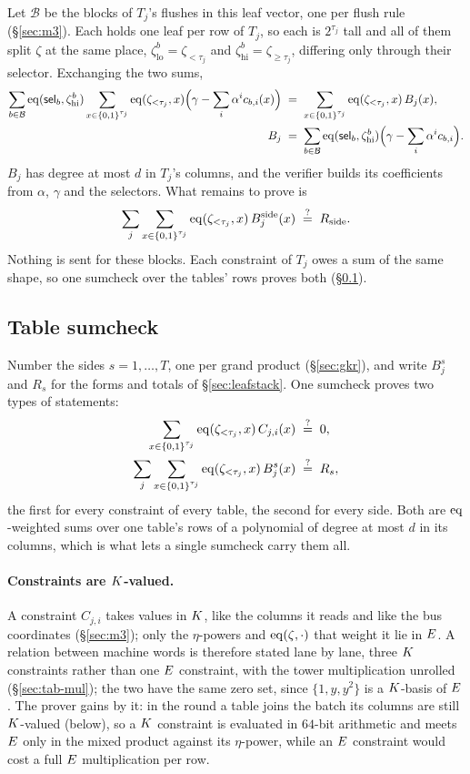 Let $\mathcal B$ be the blocks of $T_j$'s flushes in this leaf vector, one per flush rule (\S\ref{sec:m3}). Each holds one leaf per row of $T_j$, so each is $2^{\tau_j}$ tall and all of them split $\zeta$ at the same place, $\zeta^{b}_{\mathrm{lo}}=\zeta_{<\tau_j}$ and $\zeta^{b}_{\mathrm{hi}}=\zeta_{\ge\tau_j}$, differing only through their selector. Exchanging the two sums,
\begin{align*}
  \sum_{b\in\mathcal B}\operatorname{eq}(\mathsf{sel}_b,\zeta^{b}_{\mathrm{hi}})\sum_{x\in\{0,1\}^{\tau_j}}\operatorname{eq}(\zeta_{<\tau_j},x)\Bigl(\gamma-\sum_{i}\alpha^{i}c_{b,i}(x)\Bigr)
  &\;=\;\sum_{x\in\{0,1\}^{\tau_j}}\operatorname{eq}(\zeta_{<\tau_j},x)\,B_j(x),\\
  B_j&\;=\;\sum_{b\in\mathcal B}\operatorname{eq}(\mathsf{sel}_b,\zeta^{b}_{\mathrm{hi}})\Bigl(\gamma-\sum_i\alpha^{i}c_{b,i}\Bigr).
\end{align*}
$B_j$ has degree at most $d$ in $T_j$'s columns, and the verifier builds its coefficients from $\alpha$, $\gamma$ and the selectors. What remains to prove is
\[
  \sum_j\sum_{x\in\{0,1\}^{\tau_j}}\operatorname{eq}(\zeta_{<\tau_j},x)\,B^{\mathrm{side}}_j(x)\;\stackrel{?}{=}\;R_{\mathrm{side}} .
\]
Nothing is sent for these blocks. Each constraint of $T_j$ owes a sum of the same shape, so one sumcheck over the tables' rows proves both (\S\ref{sec:air}).

\subsection{Table sumcheck}\label{sec:air}

Number the sides $s=1,\dots,T$, one per grand product (\S\ref{sec:gkr}), and write $B^{s}_j$ and $R_{s}$ for the forms and totals of \S\ref{sec:leafstack}. One sumcheck proves two types of statements:
\begin{align*}
  \sum_{x\in\{0,1\}^{\tau_j}}\operatorname{eq}(\zeta_{<\tau_j},x)\,C_{j,i}(x)&\;\stackrel{?}{=}\;0,\\
  \sum_j\sum_{x\in\{0,1\}^{\tau_j}}\operatorname{eq}(\zeta_{<\tau_j},x)\,B^{s}_j(x)&\;\stackrel{?}{=}\;R_{s},
\end{align*}
the first for every constraint of every table, the second for every side. Both are $\operatorname{eq}$-weighted sums over one table's rows of a polynomial of degree at most $d$ in its columns, which is what lets a single sumcheck carry them all.

\paragraph{Constraints are $K$-valued.} A constraint $C_{j,i}$ takes values in $K$, like the columns it reads and like the bus coordinates (\S\ref{sec:m3}); only the $\eta$-powers and $\operatorname{eq}(\zeta,\cdot)$ that weight it lie in $E$. A relation between machine words is therefore stated lane by lane, three $K$ constraints rather than one $E$ constraint, with the tower multiplication unrolled (\S\ref{sec:tab-mul}); the two have the same zero set, since $\{1,y,y^{2}\}$ is a $K$-basis of $E$. The prover gains by it: in the round a table joins the batch its columns are still $K$-valued (below), so a $K$ constraint is evaluated in $64$-bit arithmetic and meets $E$ only in the mixed product against its $\eta$-power, while an $E$ constraint would cost a full $E$ multiplication per row.

